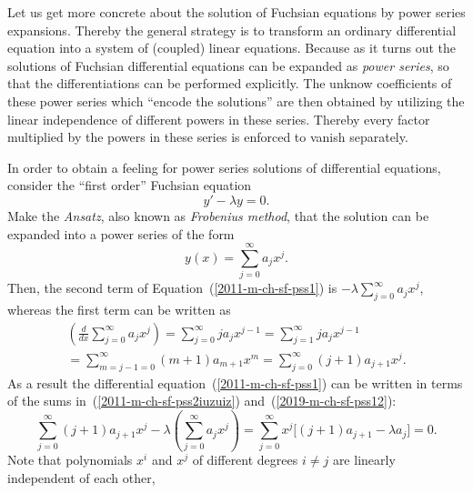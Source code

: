 Let us get more concrete about the solution of Fuchsian equations by power series expansions.
Thereby the general strategy is to transform an ordinary differential equation
into a system of (coupled) linear equations.
Because as it turns out the solutions of Fuchsian differential equations
 can be expanded as {\em power series},
so that the differentiations can be performed explicitly.
The unknow coefficients of these power series  which ``encode the solutions'' are then
obtained by utilizing the linear independence of different powers in these series.
Thereby every factor multiplied by the powers in these series is enforced to vanish separately.

{
\color{blue}
\bexample
In order to obtain a feeling for power series solutions of differential equations,
consider the ``first order'' Fuchsian equation\cite{larson-edwards-calculus}
\begin{equation}
y'-\lambda  y=0.
\label{2011-m-ch-sf-pss1}
\end{equation}
Make the {\it Ansatz}, also known as
{\em Frobenius method},\cite{arfken05}
 that the solution can be expanded into a power series of the form
\begin{equation}
y(x)=\sum_{j=0}^\infty a_j x^j.
\label{2019-m-ch-sf-pss12}
\end{equation}
Then,  the second term of Equation~(\ref{2011-m-ch-sf-pss1}) is
$-\lambda   \sum_{j=0}^\infty a_j x^j$, whereas the first term   can be written as
\begin{equation}
\begin{split}
\left(\frac{d}{dx}  \sum_{j=0}^\infty a_j x^j\right) =
 \sum_{j=0}^\infty ja_j x^{j-1}=
 \sum_{j=1}^\infty ja_j x^{j-1}\\
=
 \sum_{m=j-1=0}^\infty (m+1)a_{m+1} x^{m}=
 \sum_{ j =0}^\infty (j+1)a_{j+1} x^{j}.
\end{split}
\label{2011-m-ch-sf-pss2iuzuiz}
\end{equation}
As a result the differential equation~(\ref{2011-m-ch-sf-pss1}) can be written
in terms of the sums in~(\ref{2011-m-ch-sf-pss2iuzuiz}) and~(\ref{2019-m-ch-sf-pss12}):
\begin{equation}
 \sum_{ j =0}^\infty (j+1)a_{j+1} x^{j}
-\lambda  \left(\sum_{j=0}^\infty a_j x^j\right)=
 \sum_{ j =0}^\infty x^j\big[(j+1)a_{j+1}
-\lambda a_j \big]=
0.
\label{2019-m-ch-sf-pss1}
\end{equation}
Note that polynomials $x^i$ and $x^j$ of different degrees $i\neq j$ are linearly independent of each other,
}
